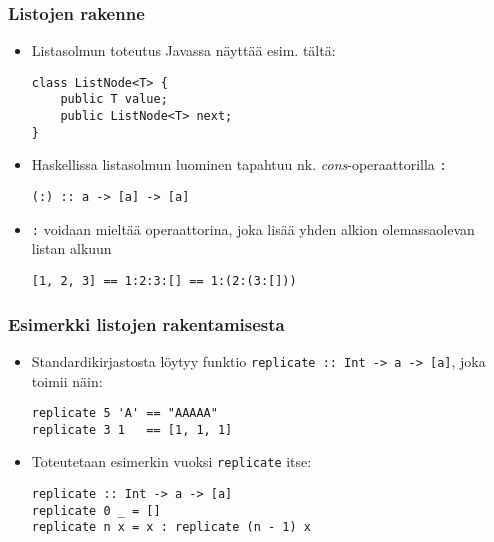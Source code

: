 \documentclass{beamer}
\begin{document}
\begin{frame}[fragile]
\frametitle{Listojen rakenne}
\begin{itemize}
\item{Listasolmun toteutus Javassa näyttää esim. tältä:}
\begin{verbatim}
class ListNode<T> {
    public T value;
    public ListNode<T> next;
}
\end{verbatim}

\item{Haskellissa listasolmun luominen tapahtuu nk. \emph{cons}-operaattorilla \texttt{:}}
\begin{verbatim}
(:) :: a -> [a] -> [a]
\end{verbatim}

\item{\texttt{:} voidaan mieltää operaattorina, joka lisää yhden alkion olemassaolevan listan alkuun}
\begin{verbatim}
[1, 2, 3] == 1:2:3:[] == 1:(2:(3:[]))
\end{verbatim}
\end{itemize}
\end{frame}

\begin{frame}[fragile]
\frametitle{Esimerkki listojen rakentamisesta}

\begin{itemize}

\item{Standardikirjastosta löytyy funktio \texttt{replicate :: Int -> a -> [a]}, joka toimii näin:}
\begin{verbatim}
replicate 5 'A' == "AAAAA"
replicate 3 1   == [1, 1, 1]
\end{verbatim}

\item{Toteutetaan esimerkin vuoksi \texttt{replicate} itse:}
\begin{verbatim}
replicate :: Int -> a -> [a]
replicate 0 _ = []
replicate n x = x : replicate (n - 1) x
\end{verbatim}

\end{itemize}
\end{frame}
\end{document}

